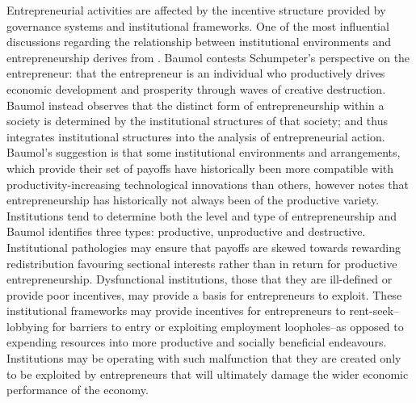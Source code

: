 Entrepreneurial activities are affected by the incentive structure provided by governance systems and institutional frameworks. One of the most influential discussions regarding the relationship between institutional environments and entrepreneurship derives from \citet{Baumol1990}. Baumol contests Schumpeter's perspective on the entrepreneur: that the entrepreneur is an individual who productively drives economic development and prosperity through waves of creative destruction. Baumol instead observes that the distinct form of entrepreneurship within a society is determined by the institutional structures of that society; and thus integrates institutional structures into the analysis of entrepreneurial action. Baumol's suggestion is that some institutional environments and arrangements, which provide their set of payoffs have historically been more compatible with productivity-increasing technological innovations than others, however notes that entrepreneurship has historically not always been of the productive variety. Institutions tend to determine both the level and type of entrepreneurship and Baumol identifies three types: productive, unproductive and destructive. Institutional pathologies may ensure that payoffs are skewed towards rewarding redistribution favouring sectional interests rather than in return for productive entrepreneurship. Dysfunctional institutions, those that they are ill-defined or provide poor incentives, may provide a basis for entrepreneurs to exploit. These institutional frameworks may provide incentives for entrepreneurs to rent-seek--lobbying for barriers to entry or exploiting employment loopholes--as opposed to expending resources into more productive and socially beneficial endeavours. Institutions may be operating with such malfunction that they are created only to be exploited by entrepreneurs that will ultimately damage the wider economic performance of the economy.

